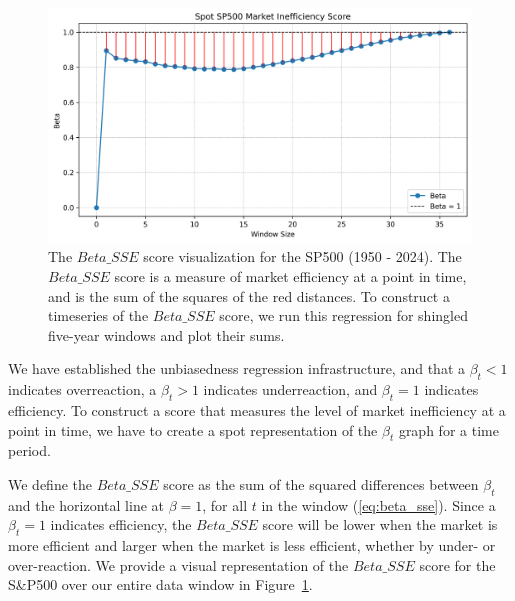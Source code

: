 \begin{figure}[h!]
    \centering
    \includegraphics[width=1\textwidth]{../figs/Spot SP500 Market Inefficiency Score.png}
    \caption{The $Beta\_SSE$ score visualization for the SP500 (1950 - 2024). The $Beta\_SSE$ score is a measure of market efficiency at a point in time, and is the sum of 
    the squares of the red distances. To construct a timeseries of the $Beta\_SSE$ score, we run this regression for shingled five-year windows and plot their sums.}
    \label{fig:sp_500_unbiasedness_sse}
\end{figure}

We have established the unbiasedness regression infrastructure, and that a $\beta_t < 1$ indicates overreaction, a $\beta_t > 1$ indicates underreaction, and $\beta_t = 1$ indicates efficiency.
To construct a score that measures the level of market inefficiency at a point in time, we have to create a spot representation of the $\beta_t$ graph for a time period.

We define the $Beta\_SSE$ score as the sum of the squared differences between $\beta_t$ and the horizontal line at $\beta = 1$, for all $t$ in the window (\ref{eq:beta_sse}).
Since a $\beta_t = 1$ indicates efficiency, the $Beta\_SSE$ score will be lower when the market is more efficient and larger when the market is less efficient, whether by under- or over-reaction.
We provide a visual representation of the $Beta\_SSE$ score for the S\&P500 over our entire data window in Figure~\ref{fig:sp_500_unbiasedness_sse}.

